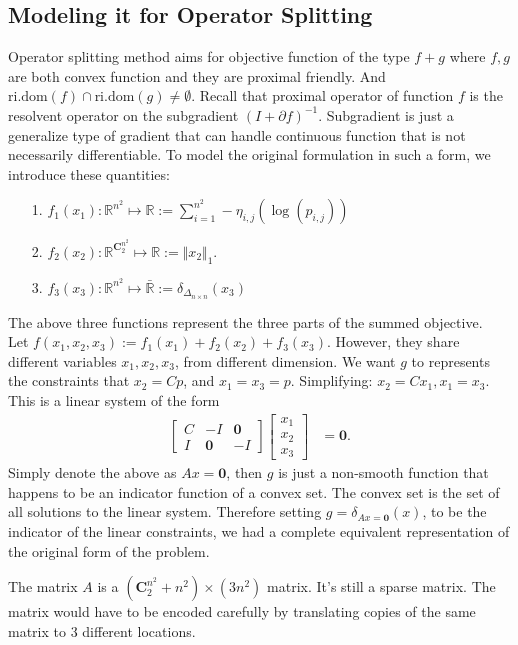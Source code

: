 \documentclass[11pt]{article}
\theoremstyle{definition}
\numberwithin{equation}{subsection}
\begin{document}
    \subsection{Modeling it for Operator Splitting}
        Operator splitting method aims for objective function of the type $f + g$ where $f, g$ are both convex function and they are proximal friendly. 
        And $\text{ri.dom}(f)\cap \text{ri.dom}(g) \neq \emptyset$. 
        Recall that proximal operator of function $f$ is the resolvent operator on the subgradient $(I + \partial f)^{-1}$. 
        Subgradient is just a generalize type of gradient that can handle continuous function that is not necessarily differentiable. 
        To model the original formulation in such a form, we introduce these quantities: 
        \begin{itemize}
            \item [1.] $f_1(x_1): \mathbb R^{n^2}\mapsto \mathbb R := \sum_{i = 1}^{n^2}-\eta_{i, j}(\log(p_{i, j}))$
            \item [2.] $f_2(x_2): \mathbb R^{\mathbf C^{n^2}_2}\mapsto \mathbb R := \Vert x_2\Vert_1$. 
            \item [3.] $f_3(x_3): \mathbb R^{n^2}\mapsto \mathbb {\bar R}:= \delta_{\Delta_{n\times n}}(x_3)$
        \end{itemize}
        The above three functions represent the three parts of the summed objective. 
        \\
        Let $f(x_1, x_2, x_3):= f_1(x_1) + f_2(x_2) + f_3(x_3)$. 
        However, they share different variables $x_1, x_2, x_3$, from different dimension. 
        We want $g$ to represents the constraints that $x_2 = Cp$, and $x_1 = x_3 = p$. 
        Simplifying: $x_2 = C x_1, x_1 = x_3$. 
        This is a linear system of the form    
        \begin{align*}
            \begin{bmatrix}
                C & -I & \mathbf 0
                \\
                I & \mathbf 0 & -I
            \end{bmatrix}
            \begin{bmatrix}
                x_1 \\ x_2 \\ x_3
            \end{bmatrix}
            &= \mathbf 0. 
        \end{align*}
        Simply denote the above as $A x = \mathbf 0$, then $g$ is just a non-smooth function that happens to be an indicator function of a convex set. 
        The convex set is the set of all solutions to the linear system. 
        Therefore setting $g = \delta_{Ax = \mathbf 0}(x)$, to be the indicator of the linear constraints, we had a complete equivalent representation of the original form of the problem. 
        \par
        The matrix $A$ is a $(\mathbf C^{n^2}_2 + n^2) \times (3n^2)$ matrix. 
        It's still a sparse matrix. 
        The matrix would have to be encoded carefully by translating copies of the same matrix to 3 different locations. 
\end{document}
